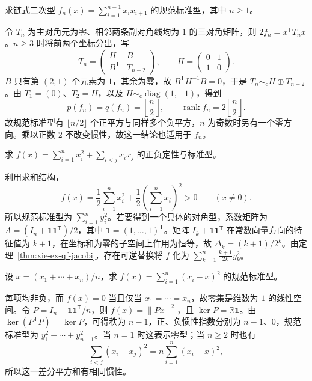 \begin{example}
\label{ex:xie-ex-qf-chain}
求链式二次型 $f_n(x)=\sum_{i=1}^{n-1}x_ix_{i+1}$ 的规范标准型，其中 $n\ge1$。
\end{example}
\begin{solve}
令 $T_n$ 为主对角元为零、相邻两条副对角线均为 $1$ 的三对角矩阵，则 $2f_n=x^{\mathsf T}T_nx$。$n\ge3$ 时将前两个坐标分出，写
\[
 T_n=\begin{pmatrix}H&B\\B^{\mathsf T}&T_{n-2}\end{pmatrix},
 \qquad H=\begin{pmatrix}0&1\\1&0\end{pmatrix}.
\]
$B$ 只有第 $(2,1)$ 个元素为 $1$，其余为零，故 $B^{\mathsf T}H^{-1}B=0$，于是 $T_n\sim_{\mathrm c}H\oplus T_{n-2}$。由 $T_1=(0)$、$T_2=H$，以及 $H\sim_{\mathrm c}\operatorname{diag}(1,-1)$，得到
\[
 p(f_n)=q(f_n)=\left\lfloor\frac n2\right\rfloor,
 \qquad \operatorname{rank}f_n=2\left\lfloor\frac n2\right\rfloor.
\]
故规范标准型有 $\lfloor n/2\rfloor$ 个正平方与同样多个负平方，$n$ 为奇数时另有一个零方向。乘以正数 $2$ 不改变惯性，故这一结论也适用于 $f_n$。
\end{solve}

\begin{example}
\label{ex:xie-ex-qf-all-cross}
求 $f(x)=\sum_{i=1}^n x_i^2+\sum_{i<j}x_ix_j$ 的正负定性与标准型。
\end{example}
\begin{solve}
利用求和结构，
\[
 f(x)=\frac12\sum_{i=1}^n x_i^2+\frac12\left(\sum_{i=1}^n x_i\right)^2>0\qquad(x\ne0).
\]
所以规范标准型为 $\sum_{i=1}^n y_i^2$。若要得到一个具体的对角型，系数矩阵为 $A=(I_n+\mathbf1\mathbf1^{\mathsf T})/2$，其中 $\mathbf1=(1,\ldots,1)^{\mathsf T}$。矩阵 $I_k+\mathbf1\mathbf1^{\mathsf T}$ 在常数向量方向的特征值为 $k+1$，在坐标和为零的子空间上作用为恒等，故 $\Delta_k=(k+1)/2^k$。由定理~\ref{thm:xie-ex-qf-jacobi}，存在可逆替换将 $f$ 化为 $\sum_{k=1}^n\frac{k+1}{2k}y_k^2$。
\end{solve}

\begin{example}
\label{ex:xie-ex-qf-centering}
设 $\bar x=(x_1+\cdots+x_n)/n$，求 $f(x)=\sum_{i=1}^n(x_i-\bar x)^2$ 的规范标准型。
\end{example}
\begin{solve}
每项均非负，而 $f(x)=0$ 当且仅当 $x_1=\cdots=x_n$，故零集是维数为 $1$ 的线性空间。令 $P=I_n-\mathbf1\mathbf1^{\mathsf T}/n$，则 $f(x)=\|Px\|^2$，且 $\ker P=\mathbb R\mathbf1$。由 $\ker(P^{\mathsf T}P)=\ker P$，可得秩为 $n-1$，正、负惯性指数分别为 $n-1$、$0$，规范标准型为 $y_1^2+\cdots+y_{n-1}^2$。当 $n=1$ 时这表示零型；当 $n\ge2$ 时也有
\[
 \sum_{i<j}(x_i-x_j)^2=n\sum_{i=1}^n(x_i-\bar x)^2,
\]
所以这一差分平方和有相同惯性。
\end{solve}

